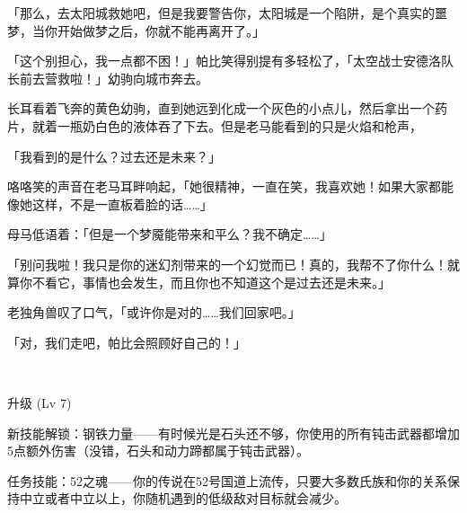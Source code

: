 「那么，去太阳城救她吧，但是我要警告你，太阳城是一个陷阱，是个真实的噩梦，当你开始做梦之后，你就不能再离开了。」

「这个别担心，我一点都不困！」帕比笑得别提有多轻松了，「太空战士安德洛队长前去营救啦！」幼驹向城市奔去。

长耳看着飞奔的黄色幼驹，直到她远到化成一个灰色的小点儿，然后拿出一个药片，就着一瓶奶白色的液体吞了下去。但是老马能看到的只是火焰和枪声，

「我看到的是什么？过去还是未来？」

咯咯笑的声音在老马耳畔响起，「她很精神，一直在笑，我喜欢她！如果大家都能像她这样，不是一直板着脸的话……」

母马低语着：「但是一个梦魇能带来和平么？我不确定……」

「别问我啦！我只是你的迷幻剂带来的一个幻觉而已！真的，我帮不了你什么！就算你不看它，事情也会发生，而且你也不知道这个是过去还是未来。」

老独角兽叹了口气，「或许你是对的……我们回家吧。」

「对，我们走吧，帕比会照顾好自己的！」

\clearpage

~\vfill

\begin{note}
升级 (Lv 7)

新技能解锁：钢铁力量——有时候光是石头还不够，你使用的所有钝击武器都增加5点额外伤害（没错，石头和动力蹄都属于钝击武器）。

任务技能：52之魂——你的传说在52号国道上流传，只要大多数氏族和你的关系保持中立或者中立以上，你随机遇到的低级敌对目标就会减少。
\end{note}

